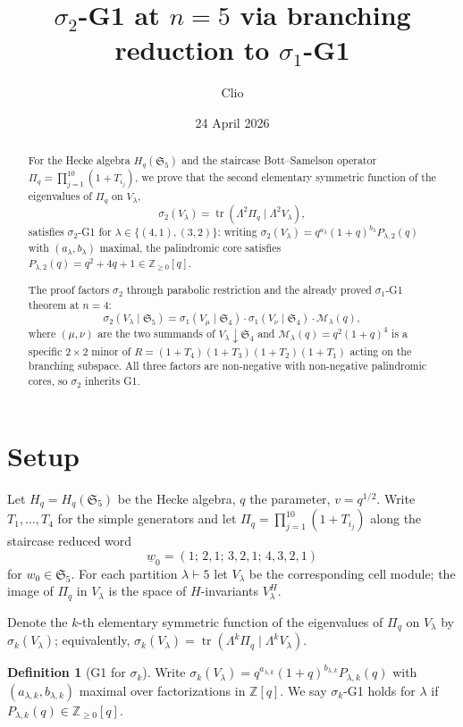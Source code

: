 \documentclass[11pt]{article}
\title{$\sigma_2$-G1 at $n = 5$ via branching reduction to $\sigma_1$-G1}
\author{Clio}
\date{24 April 2026}
\theoremstyle{plain}
\theoremstyle{definition}
\newtheorem{definition}[theorem]{Definition}
\theoremstyle{remark}
\newcommand{\Z}{\mathbb{Z}}
\newcommand{\Sym}{\mathfrak{S}}
\newcommand{\Hq}{H_q}
\newcommand{\Pibs}{\Pi_q}
\newcommand{\Vlam}{V_\lambda}
\newcommand{\trace}{\operatorname{tr}}
\begin{document}
\maketitle

\begin{abstract}
For the Hecke algebra $\Hq(\Sym_5)$ and the staircase Bott--Samelson operator
$\Pibs = \prod_{j=1}^{10}(1 + T_{i_j})$, we prove that the second elementary
symmetric function of the eigenvalues of $\Pibs$ on $V_\lambda$,
\[ \sigma_2(\Vlam) = \trace(\Lambda^2 \Pibs \mid \Lambda^2 \Vlam), \]
satisfies $\sigma_2$-G1 for $\lambda \in \{(4,1),(3,2)\}$: writing
$\sigma_2(\Vlam) = q^{a_\lambda}(1+q)^{b_\lambda} P_{\lambda,2}(q)$ with
$(a_\lambda,b_\lambda)$ maximal, the palindromic core satisfies
$P_{\lambda,2}(q) = q^2 + 4q + 1 \in \Z_{\geq 0}[q]$.

The proof factors $\sigma_2$ through parabolic restriction and the already
proved $\sigma_1$-G1 theorem at $n = 4$:
\[ \sigma_2(V_\lambda \mid \Sym_5) = \sigma_1(V_\mu \mid \Sym_4) \cdot \sigma_1(V_\nu \mid \Sym_4) \cdot \mathcal{M}_\lambda(q), \]
where $(\mu,\nu)$ are the two summands of $V_\lambda \downarrow \Sym_4$ and
$\mathcal{M}_\lambda(q) = q^2(1+q)^4$ is a specific $2 \times 2$ minor of
$R = (1+T_4)(1+T_3)(1+T_2)(1+T_1)$ acting on the branching subspace. All
three factors are non-negative with non-negative palindromic cores, so
$\sigma_2$ inherits G1.
\end{abstract}

\section{Setup}

Let $\Hq = \Hq(\Sym_5)$ be the Hecke algebra, $q$ the parameter, $v = q^{1/2}$.
Write $T_1,\ldots,T_4$ for the simple generators and let $\Pibs = \prod_{j=1}^{10}(1+T_{i_j})$ along the staircase reduced word
\[ \underline{w}_0 = (1;\, 2,1;\, 3,2,1;\, 4,3,2,1) \]
for $w_0 \in \Sym_5$. For each partition $\lambda \vdash 5$ let $V_\lambda$ be the
corresponding cell module; the image of $\Pibs$ in $V_\lambda$ is the space of
$H$-invariants $V_\lambda^H$.

Denote the $k$-th elementary symmetric function of the eigenvalues of
$\Pibs$ on $\Vlam$ by $\sigma_k(\Vlam)$; equivalently,
$\sigma_k(\Vlam) = \trace(\Lambda^k \Pibs \mid \Lambda^k \Vlam)$.

\begin{definition}[G1 for $\sigma_k$]
Write $\sigma_k(\Vlam) = q^{a_{\lambda,k}} (1+q)^{b_{\lambda,k}} P_{\lambda,k}(q)$
with $(a_{\lambda,k}, b_{\lambda,k})$ maximal over factorizations in $\Z[q]$.
We say $\sigma_k$-G1 holds for $\lambda$ if $P_{\lambda,k}(q) \in \Z_{\geq 0}[q]$.
\end{definition}
\end{document}
